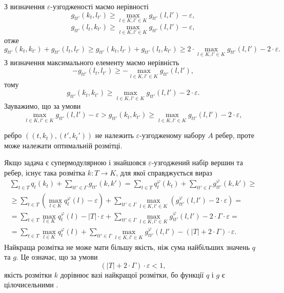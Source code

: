 З визначення $\varepsilon$-узгодженості маємо нерівності
\begin{equation}
    g_{tt'}(k_t,l_{t'})\geq \max\limits_{l\in K, l'\in K}g_{tt'}(l,l')-\varepsilon,
\end{equation}
\begin{equation}
    g_{tt'}(l_t,k_{t'})\geq \max\limits_{l\in K, l'\in K}g_{tt'}(l,l')-\varepsilon,
\end{equation}
отже 
\begin{equation}
    g_{tt'}(k_t,k_{t'})+g_{tt'}(l_t,l_{t'})\geq g_{tt'}(k_t,l_{t'})+g_{tt'}(l_t,k_{t'})\geq 2\cdot \max\limits_{l\in K, l'\in K}g_{tt'}(l,l')- 2\cdot \varepsilon.
\end{equation}
З визначення максимального елементу маємо нерівність
\begin{equation}
    -g_{tt'}(l_t,l_{t'})\geq -\max\limits_{l\in K, l'\in K}g_{tt'}(l,l'),
\end{equation}
тому 
\begin{equation}
    g_{tt'}(k_t,k_{t'})\geq \max\limits_{l\in K, l'\in K}g_{tt'}(l,l') - 2\cdot \varepsilon.
\end{equation}
Зауважимо, що за умови
\begin{equation}
    \max\limits_{l\in K, l'\in K}g_{tt'}(l,l') - \varepsilon > g_{tt'}(k_t,k_{t'})\geq \max\limits_{l\in K, l'\in K}g_{tt'}(l,l') - 2\cdot \varepsilon,
\end{equation}

ребро $((t,k_t),(t',k_t'))$ не належить $\varepsilon$-узгодженому набору $A$ ребер, проте може 
належати оптимальній розмітці.

Якщо задача є супермодулярною і знайшовся $\varepsilon$-узгоджений набір вершин та ребер, існує 
така розмітка $k:T\rightarrow K$, для якої справджується вираз 
\begin{equation}
    \begin{aligned}
        \sum_{t \in T} q_t(k_t) + \sum_{tt' \in \Gamma} g_{tt'}(k,k')=\sum_{t \in T} q^\varphi_t(k_t) + \sum_{tt' \in \Gamma} g^\varphi_{tt'}(k,k')\geq\\
        \geq \sum_{t \in T} \left( \max_{l\in K} q^\varphi_t(l) -\varepsilon \right) + \sum_{tt' \in \Gamma}  \max\limits_{l\in K, l'\in K} \left( g^\varphi_{tt'}(l,l') - 2\cdot\varepsilon \right)=\\
        = \sum_{t \in T} \max_{l\in K} q^\varphi_t(l) - |T|\cdot\varepsilon  + \sum_{tt' \in \Gamma}  \max\limits_{l\in K, l'\in K} g^\varphi_{tt'}(l,l') - 2\cdot\Gamma\cdot\varepsilon=\\
        = \sum_{t \in T} \max_{l\in K} q^\varphi_t(l) + \sum_{tt' \in \Gamma}  \max\limits_{l\in K, l'\in K} g^\varphi_{tt'}(l,l') - \left( |T|+2\cdot\Gamma \right)\cdot\varepsilon.
    \end{aligned}
\end{equation}
Найкраща розмітка не може мати більшу якість, ніж сума найбільших значень $q$ та $g$.
Це означає, що за умови 
\begin{equation}
    (|T|+2\cdot\Gamma)\cdot\varepsilon<1,
\end{equation}
якість розмітки $k$ дорівнює вазі найкращої розмітки, бо функції $q$ і $g$ є цілочисельними \cite{diffusion_shlezinger}.

